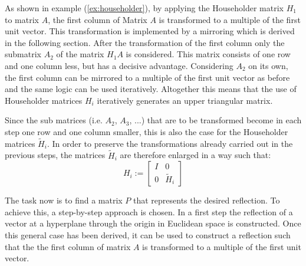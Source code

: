 As shown in example (\ref{ex:householder}), by applying the Householder matrix $H_1$ to matrix $A$, the first column of Matrix $A$ is transformed to a multiple of the first unit vector. This transformation is implemented by a mirroring which is derived in the following section. After the transformation of the first column only the submatrix $A_2$ of the matrix $H_1A$ is considered. This matrix consists of one row and one column less, but has a decisive advantage. Considering $A_2$ on its own, the first column can be mirrored to a multiple of the first unit vector as before and the same logic can be used iteratively. Altogether this means that the use of Householder matrices $H_i$ iteratively generates an upper triangular matrix.

\begin{remark}
	Since the sub matrices (i.e. $A_2$, $A_3$, ...) that are to be transformed become in each step one row and one column smaller, this is also the case for the Householder matrices $\tilde{H}_i$. In order to preserve the transformations already carried out in the previous steps, the matrices $\tilde{H}_i$ are therefore enlarged in a way such that:
	\begin{equation*}
		H_i := \left[
		\begin{array}{cc}
		I & 0 \\
		0 & \tilde{H}_i
		\end{array}
		\right]
	\end{equation*}
\end{remark}

The task now is to find a matrix $P$ that represents the desired reflection. To achieve this, a step-by-step approach is chosen. In a first step the reflection of a vector at a hyperplane through the origin in Euclidean space is constructed. Once this general case has been derived, it can be used to construct a reflection such that the the first column of matrix $A$ is transformed to a multiple of the first unit vector.



